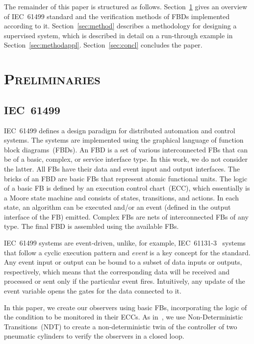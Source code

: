 \documentclass[conference]{IEEEtran}
\begin{document}
The remainder of this paper is structured as follows. Section~\ref{sec:prelim} gives an overview of IEC~61499 standard and the verification methods of FBDs implemented according to it. Section~\ref{sec:method} describes a methodology for designing a supervised system, which is described in detail on a run-through example in Section~\ref{sec:methodappl}. Section~\ref{sec:concl} concludes the paper.

\section{\textsc{Preliminaries}}
\label{sec:prelim}
\subsection{IEC~61499}
IEC~61499 defines a design paradigm for distributed automation and control systems. The systems are implemented using the graphical language of function block diagrams~(FBDs). An FBD is a set of various interconnected FBs that can be of a basic, complex, or service interface type. In this work, we do not consider the latter. All FBs have their data and event input and output interfaces. The bricks of an FBD are basic FBs that represent atomic functional units. The logic of a basic FB is defined by an execution control chart~(ECC), which essentially is a Moore state machine and consists of states, transitions, and actions. In each state, an algorithm can be executed and/or an event (defined in the output interface of the FB) emitted. Complex FBs are nets of interconnected FBs of any type. The final FBD is assembled using the available FBs.

IEC~61499 systems are event-driven, unlike, for example, \mbox{IEC~61131-3}~\cite{tiegelkamp1995iec} systems that follow a cyclic execution pattern and \emph{event} is a key concept for the standard. Any event input or output can be bound to a subset of data inputs or outputs, respectively, which means that the corresponding data will be received and processed or sent only if the particular event fires. Intuitively, any update of the event variable opens the gates for the data connected to it.

In this paper, we create our observers using basic FBs, incorporating the logic of the condition to be monitored in their ECCs. As in~\cite{toolchain}, we use Non-Deterministic Transitions~(NDT) to create a non-deterministic twin of the controller of two pneumatic cylinders to verify the observers in a closed loop.
\end{document}
